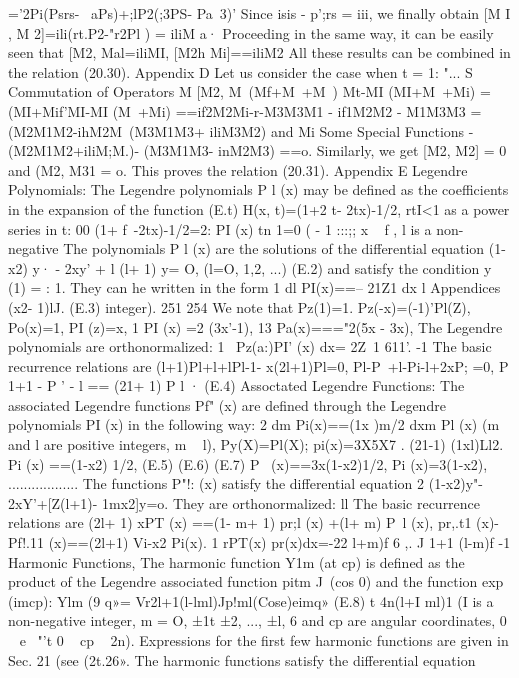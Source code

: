 \documentclass[a4paper,sfsidenotes,colorlinks=true]{tufte-book}
\numberwithin{equation}{section}
\numberwithin{figure}{section}
\begin{document}
{{{{{{='2Pi(Psrs-	~aPs)+;lP2(;3PS- Pa~3)' Since isis - p';rs = iii, we finally obtain
[M I , M 2]=ili(rt.P2-"r2Pl ) = iliM a· Proceeding in the same way, it can be easily seen that [M2, Mal=iliMI, [M2h Mi]==iliM2 All these results can be combined in the relation (20.30).
Appendix D Let us consider the case when t = 1:
"... S Commutation of Operators M
[M2,
M~(Mf+M~+M~) Mt-MI (MI+M~+Mi) =(MI+Mif'MI-MI (M~+Mi) ==if2M2Mi-r-M3M3M1 - if1M2M2 - M1M3M3 = (M2M1M2-ihM2M~(M3M1M3+ iliM3M2)
and Mi
Some Special Functions
-(M2M1M2+iliM;M.)- (M3M1M3-	inM2M3) ==o. Similarly, we get [M2, M2] = 0 and (M2, M31 = o. This proves
the relation (20.31).
Appendix E
Legendre Polynomials: The Legendre polynomials P l (x) may be defined as the coefficients in the expansion of the function
(E.t)
H(x, t)=(1+2
t- 2tx)-1/2, rtI<1 as a power series in t:
00
(1+ f~-2tx)-1/2=2: PI (x) tn 1=0
( - 1	:::;;	x	~	f ,	l	is	a	non-negative The polynomials P l (x) are the solutions of the differential equation (1-x2) y· - 2xy' + l (l+ 1) y= O, (l=O, 1,2, ...)	(E.2) and satisfy the condition y (1) = : 1. They can he written in the form
1 dl PI(x)==--
21Z1	dx l Appendices
(x2- 1)lJ.
(E.3)
integer).
251
254
We note that
Pz(1)=1. Pz(-x)=(-1)'Pl(Z), Po(x)=1, PI (z)=x,
1 PI (x) =2 (3x'-1),
13 Pa(x)==="2(5x - 3x),
The Legendre polynomials are orthonormalized: 1
~Pz(a:)PI' (x) dx= 2Z~1 611'. -1
The basic recurrence relations are
(l+1)Pl+l+lPl-1- x(2l+1)Pl=0, Pl-P~+l-Pi-l+2xP; =0, P 1+1 - P ' - l == (21+ 1) P l ·
(E.4)
Assoctated Legendre Functions: The associated Legendre functions Pf" (x) are defined through the Legendre polynomials PI (x) in the following way:
2 dm Pi(x)==(1x )m/2 dxm Pl (x)
(m and l are positive integers, m ~ l),
Py(X)=Pl(X);	pi(x)=3X5X7 . (21-1) (1xl)Ll2. Pi (x) ==(1-x2) 1/2,
(E.5)
(E.6)
(E.7)
P~ (x)==3x(1-x2)1/2, Pi (x)=3(1-x2),
..................
The functions P"!: (x) satisfy the differential equation 2
(1-x2)y"- 2xY'+[Z(l+1)- 1mx2]y=o.
They are orthonormalized:
ll
The basic recurrence relations are (2l+ 1) xPT (x) ==(1- m+ 1) pr;l (x) +(l+ m) P~l (x), pr,.t1 (x)-Pf!.11 (x)==(2l+1) Vi-x2 Pi(x).
1 rPT(x) pr(x)dx=-22 {l+m)f 6 ,.
J	1+1 (l-m)f -1
Harmonic Functions, The harmonic function Y1m (at cp) is defined as the product of the Legendre associated function	pitm J~(cos 0) and the function exp (imcp):
Ylm (9 q»= Vr2l+1(l-lml)Jp!ml(Cose)eimq»	(E.8) t	4n(l+I ml)1
(I is a non-negative integer, m = O, ±1t	±2, ..., ±l, 6 and cp are angular coordinates, 0 ~ e~ "'t 0 ~ cp ~ 2n). Expressions for the first few harmonic functions are given in Sec. 21 (see (2t.26». The harmonic functions satisfy the differential equation
}}}}}}}
\end{document}
